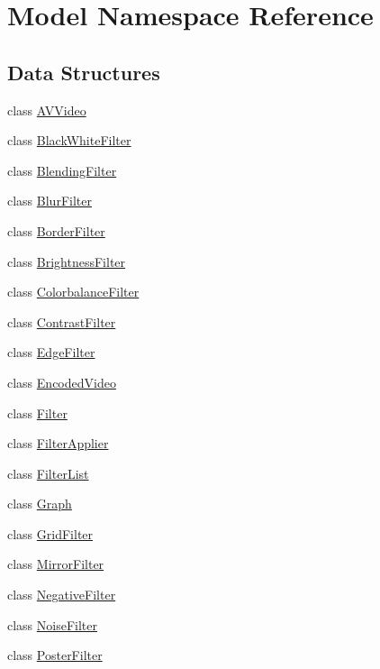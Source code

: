 \hypertarget{namespaceModel}{}\section{Model Namespace Reference}
\label{namespaceModel}
\subsection*{Data Structures}
\begin{DoxyCompactItemize}
\item 
class \hyperlink{classModel_1_1AVVideo}{A\+V\+Video}
\item 
class \hyperlink{classModel_1_1BlackWhiteFilter}{Black\+White\+Filter}
\item 
class \hyperlink{classModel_1_1BlendingFilter}{Blending\+Filter}
\item 
class \hyperlink{classModel_1_1BlurFilter}{Blur\+Filter}
\item 
class \hyperlink{classModel_1_1BorderFilter}{Border\+Filter}
\item 
class \hyperlink{classModel_1_1BrightnessFilter}{Brightness\+Filter}
\item 
class \hyperlink{classModel_1_1ColorbalanceFilter}{Colorbalance\+Filter}
\item 
class \hyperlink{classModel_1_1ContrastFilter}{Contrast\+Filter}
\item 
class \hyperlink{classModel_1_1EdgeFilter}{Edge\+Filter}
\item 
class \hyperlink{classModel_1_1EncodedVideo}{Encoded\+Video}
\item 
class \hyperlink{classModel_1_1Filter}{Filter}
\item 
class \hyperlink{classModel_1_1FilterApplier}{Filter\+Applier}
\item 
class \hyperlink{classModel_1_1FilterList}{Filter\+List}
\item 
class \hyperlink{classModel_1_1Graph}{Graph}
\item 
class \hyperlink{classModel_1_1GridFilter}{Grid\+Filter}
\item 
class \hyperlink{classModel_1_1MirrorFilter}{Mirror\+Filter}
\item 
class \hyperlink{classModel_1_1NegativeFilter}{Negative\+Filter}
\item 
class \hyperlink{classModel_1_1NoiseFilter}{Noise\+Filter}
\item 
class \hyperlink{classModel_1_1PosterFilter}{Poster\+Filter}
\item 

\end{DoxyCompactItemize}
